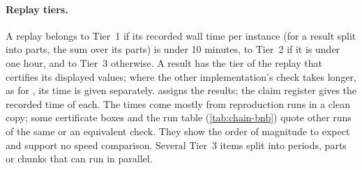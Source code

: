 \paragraph{Replay tiers.}
A replay belongs to Tier~1 if its recorded wall time per instance (for a result split into parts, the sum over its parts) is under 10 minutes, to Tier~2 if it is under one hour, and to Tier~3 otherwise.
A result has the tier of the replay that certifies its displayed values; where the other implementation's check takes longer, as for , its time is given separately.
 assigns the results; the claim register gives the recorded time of each.
The times come mostly from reproduction runs in a clean copy; some certificate boxes and the  run table (\cref{tab:chain-bnb}) quote other runs of the same or an equivalent check.
They show the order of magnitude to expect and support no speed comparison.
Several Tier~3 items split into periods, parts or chunks that can run in parallel.

